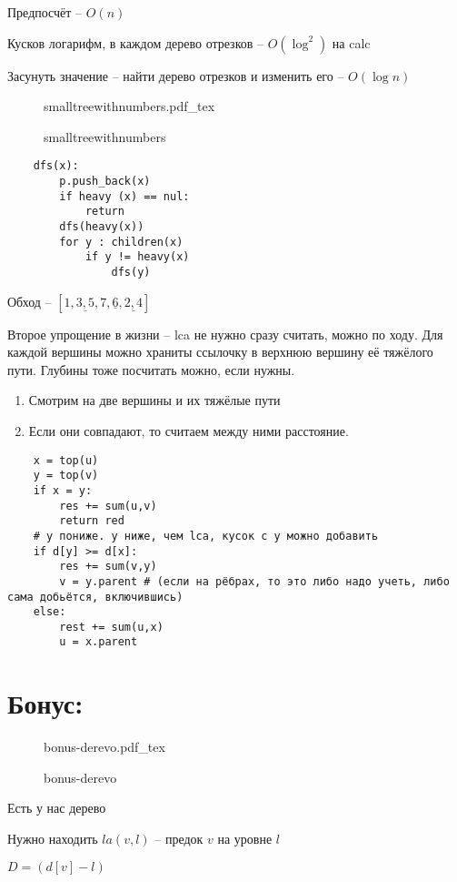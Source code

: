 \documentclass{book}
\theoremstyle{definition}
\newcommand{\incfig}[1]{%
    \def\svgwidth{\columnwidth}
    {#1.pdf_tex}
}
\begin{document}
Предпосчёт -- $O(n)$

Кусков логарифм, в каждом дерево отрезков -- $O(\log ^2)$ на calc

Засунуть значение -- найти дерево отрезков и изменить его -- $O(\log n)$

\begin{figure}[!ht]
    \centering
    \incfig{smalltreewithnumbers}
    \caption{smalltreewithnumbers}
    \label{fig:smalltreewithnumbers}
\end{figure}

\begin{lstlisting}
    dfs(x):
        p.push_back(x)
        if heavy (x) == nul:
            return
        dfs(heavy(x))
        for y : children(x)
            if y != heavy(x)
                dfs(y)
\end{lstlisting}
Обход -- $\left[ \underline{1,3,5,7},\underline{6},\underline{2,4} \right] $

Второе упрощение в жизни -- lca не нужно сразу считать, можно по ходу. Для каждой вершины можно храниты ссылочку в верхнюю вершину её тяжёлого пути. Глубины тоже посчитать можно, если нужны.

\begin{enumerate}
    \item Смотрим на две вершины и их тяжёлые пути
    \item Если они совпадают, то считаем между ними расстояние.
\end{enumerate}

\begin{lstlisting}
    x = top(u)
    y = top(v)
    if x = y:
        res += sum(u,v)
        return red
    # y пониже. y ниже, чем lca, кусок с y можно добавить
    if d[y] >= d[x]:
        res += sum(v,y)
        v = y.parent # (если на рёбрах, то это либо надо учеть, либо сама добьётся, включившись)
    else:
        rest += sum(u,x)
        u = x.parent
\end{lstlisting}

\section{Бонус: }
\begin{figure}[!ht]
    \centering
    \incfig{bonus-derevo}
    \caption{bonus-derevo}
    \label{fig:bonus-derevo}
\end{figure}
\begin{problem}
    Есть у нас дерево

Нужно находить $la(v,l)$ -- предок  $v$ на уровне $l$

$D = \left( d[v] - l \right) $
\end{problem}
\end{document}
